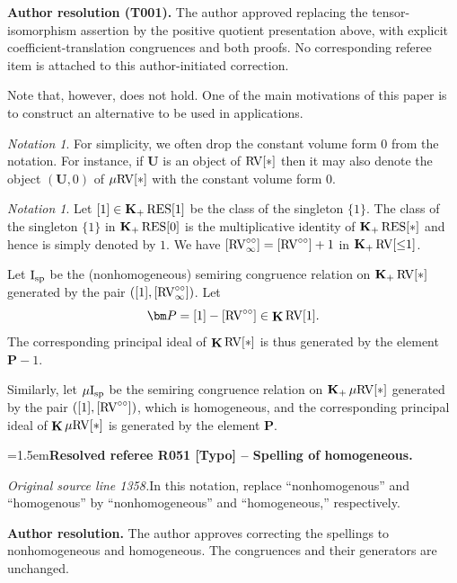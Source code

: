 \documentclass[12pt]{amsart}
\newcommand{\ResolvedRefereeRemark}[5]{%
  \par\medskip\begingroup\normalfont\small\color{gray}%
  \emergencystretch=1.5em\noindent\textbf{Resolved referee R#1 [#2] -- #3.}\par\nobreak\noindent #4\par
  \medskip\color{ResolutionGreen}\noindent\textbf{Author resolution.} #5\par
  \endgroup\medskip
}
\theoremstyle{plain}
\theoremstyle{definition}
\theoremstyle{remark}
\newtheorem{nota}[thm]{Notation}
\numberwithin{equation}{section}
\theoremstyle{plain}
\newcommand{\RV}{\textup{RV}}
\newcommand{\0}{\emptyset}
\newcommand{\mgRV}{{\mu}{\RV}}
\newcommand{\RES}{\textup{RES}}
\newcommand{\isp}{\textup{I}_{\textup{sp}}}
\newcommand{\mgisp}{\mu \isp}
\DeclareMathOperator{\gsk}{\mathbf{K}_+}
\DeclareMathOperator{\ggk}{\mathbf{K}}
\newcommand{\ccirc}{\circ \circ}
\begin{document}
{\normalfont\small\color{ResolutionGreen}
\noindent\textbf{Author resolution (T001).} The author approved replacing
 the tensor-isomorphism assertion by the positive quotient presentation
 above, with explicit coefficient-translation congruences and both proofs.
 No corresponding referee item is attached to this author-initiated correction.\par}

Note that, however, \cite[Proposition~10.10(2)]{hrushovski:kazhdan:integration:vf} does not hold. One of the main motivations of this paper is to construct an alternative to be used in applications.

\begin{nota}\label{drop:0}
For simplicity, we often drop the constant volume form $0$ from the notation. For instance, if $\bm U$ is an object of $\RV[*]$ then it may also denote the  object $(\bm U, 0)$ of $\mgRV[*]$ with the constant volume form $0$.
\end{nota}

\begin{nota}
Let $[1] \in \gsk \RES[1]$ be the class of the singleton $\{1\}$. The class of the singleton $\{1\}$ in $\gsk \RES[0]$ is the multiplicative identity of $\gsk \RES[*]$ and hence is simply denoted by $1$. We have $[\RV^{\circ\circ}_\infty] = [\RV^{\circ\circ}] + 1$ in $\gsk \RV[{\leq} 1]$.

Let $\isp$ be the (nonhomogeneous) semiring congruence relation on $\gsk \RV[*]$ generated by the pair $([1], [\RV^{\circ\circ}_\infty])$. Let
\[
\bm P = [1]-[\RV^{\ccirc}]  \in \ggk \RV[1].
\]
The corresponding principal ideal of $\ggk \RV[*]$ is thus generated by the element $\bm P - 1$.


Similarly, let $\mgisp$ be the  semiring congruence relation on $\gsk \mgRV[*]$ generated by the pair $([1], [\RV^{\circ\circ}])$, which is homogeneous, and the corresponding principal ideal of $\ggk \mgRV[*]$ is generated by the element $\bm P$.
\end{nota}

\ResolvedRefereeRemark{051}{Typo}{Spelling of homogeneous}{%
\textit{Original source line 1358.}\quad In this notation, replace ``nonhomogenous'' and ``homogenous'' by ``nonhomogeneous'' and ``homogeneous,'' respectively.
}{The author approves correcting the spellings to nonhomogeneous and homogeneous. The congruences and their generators are unchanged.}
\end{document}
